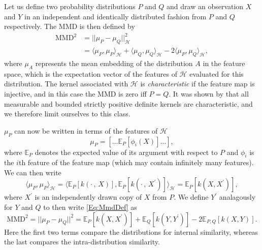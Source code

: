 Let us define two probability distributions $P$ and $Q$ and draw an observation $X$ and $Y$ in an independent and identically distributed fashion from $P$ and $Q$ respectively.
The MMD is then defined by
\begin{equation}\label{Eq:MmdDef}
\begin{aligned}
    \mathrm{MMD}^2 &= ||\mu_P - \mu_Q ||_\mathcal{H}^2\\
    &= \langle \mu_P, \mu_P \rangle_\mathcal{H} +
       \langle \mu_Q, \mu_Q \rangle_\mathcal{H} -
       2 \langle \mu_P, \mu_Q \rangle_\mathcal{H},
\end{aligned}
\end{equation}
where $\mu_A$ represents the mean embedding of the distribution $A$ in the feature space, which is the expectation vector of the features of $\mathcal{H}$ evaluated for this distribution.
The kernel associated with $\mathcal{H}$ is \emph{characteristic} if the feature map is injective, and in this case the MMD is zero iff $P = Q$.
It was shown by \citet{Sriperumbudur2009} that all measurable and bounded strictly positive definite kernels are characteristic, and we therefore limit ourselves to this class.

$\mu_P$ can now be written in terms of the features of $\mathcal{H}$
\begin{equation}
    \mu_P = [\ldots \mathbb{E}_P[\phi_i(X)] \ldots],
\end{equation}
where $\mathbb{E}_P$ denotes the expected value of its argument with respect to $P$ and $\phi_i$ is the $i$th feature of the feature map (which may contain infinitely many features).
We can then write
\begin{equation}
    \langle \mu_P, \mu_P \rangle_\mathcal{H} = \langle \mathbb{E}_P [k(\cdot\, ,\, X)], \mathbb{E}_{P} [k(\cdot\, ,\, X^\prime)] \rangle_\mathcal{H} = \mathbb{E}_{P} [k(X, X^\prime)],
\end{equation}
where $X^\prime$ is an independently drawn copy of $X$ from $P$.
We define $Y^\prime$ analagously for $Y$ and $Q$ to then write \eqref{Eq:MmdDef} as
\begin{equation}
    \mathrm{MMD}^2 = ||\mu_P - \mu_Q|| ^2
                   = \mathbb{E}_P [k(X, X^\prime)] + \mathbb{E}_Q [k(Y, Y^\prime)] - 2 \mathbb{E}_{P,Q}[k(X,Y)].
\end{equation}
Here the first two terms compare the distributions for internal similarity, whereas the last compares the intra-distribution similarity.

